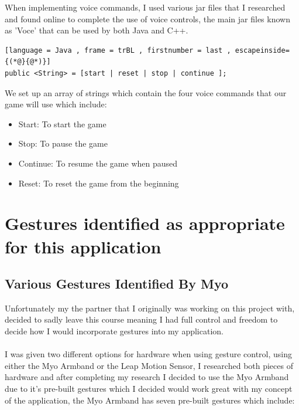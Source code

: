 \documentclass{article}
\begin{document}
When implementing voice commands, I used various jar files that I researched and found online to complete the use of voice controls, the main jar files known as 'Voce' that can be used by both Java and C++.

\begin{lstlisting}[language = Java , frame = trBL , firstnumber = last , escapeinside={(*@}{@*)}]
public <String> = [start | reset | stop | continue ];
\end{lstlisting}
We set up an array of strings which contain the four voice commands that our game will use which include:

\begin{itemize}
    \item Start: To start the game
    \item Stop: To pause the game
    \item Continue: To resume the game when paused
    \item Reset: To reset the game from the beginning
\end{itemize}

\section{Gestures identified as appropriate for this application}

\subsection{Various Gestures Identified By Myo}

Unfortunately my the partner that I originally was working on this project with, decided to sadly leave this course meaning I had full control and freedom to decide how I would incorporate gestures into my application.\\ \\
I was given two different options for hardware when using gesture control, using either the Myo Armband or the Leap Motion Sensor, I researched both pieces of hardware and after completing my research I decided to use the Myo Armband due to it's pre-built gestures which I decided would work great with my concept of the application, the Myo Armband has seven pre-built gestures which include:
\end{document}

